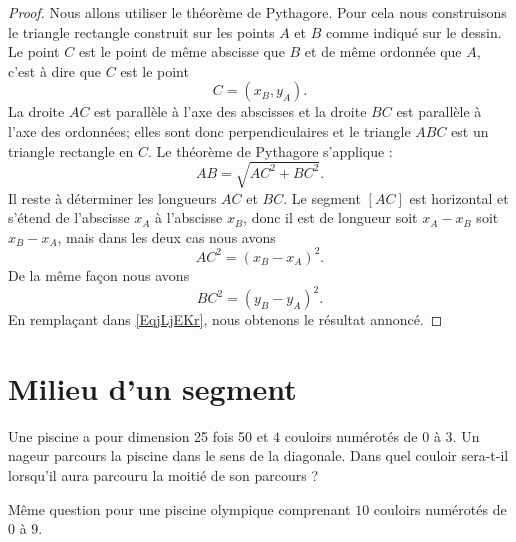 \begin{proof}
    Nous allons utiliser le théorème de Pythagore. Pour cela nous construisons le triangle rectangle construit sur les points \( A\) et \( B\) comme indiqué sur le dessin. Le point \( C\) est le point de même abscisse que \( B\) et de même ordonnée que \( A\), c'est à dire que \( C\) est le point
    \begin{equation}
        C=(x_B,y_A).
    \end{equation}
    La droite \( AC\) est parallèle à l'axe des abscisses et la droite \( BC\) est parallèle à l'axe des ordonnées; elles sont donc perpendiculaires et le triangle \( ABC\) est un triangle rectangle en \( C\). Le théorème de Pythagore s'applique :
    \begin{equation}    \label{EqjLjEKr}
       AB =\sqrt{ AC^2+BC^2}.
    \end{equation}
    Il reste à déterminer les longueurs \(  AC \) et \(  BC \). Le segment \( [AC]\) est horizontal et s'étend de l'abscisse \( x_A\) à l'abscisse \( x_B\), donc il est de longueur soit \( x_A-x_B\) soit \( x_B-x_A\), mais dans les deux cas nous avons
    \begin{equation}
         AC^2=(x_B-x_A)^2.
    \end{equation}
    De la même façon nous avons 
    \begin{equation}
         BC^2=(y_B-y_A)^2.
    \end{equation}
    En remplaçant dans \eqref{EqjLjEKr}, nous obtenons le résultat annoncé.
\end{proof}

\section{Milieu d'un segment}


    Une piscine a pour dimension \unit{25}{\meter} fois \unit{50}{\meter} et \( 4\) couloirs numérotés de \( 0\) à \( 3\). Un nageur parcours la piscine dans le sens de la diagonale. Dans quel couloir sera-t-il lorsqu'il aura parcouru la moitié de son parcours ?

    Même question pour une piscine olympique comprenant \( 10\) couloirs numérotés de \( 0\) à \( 9\).

    
    \vspace{1cm}

